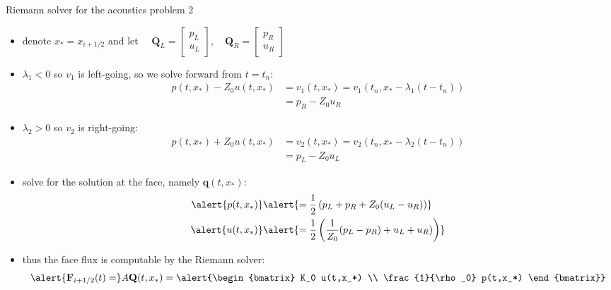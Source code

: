 \documentclass[10pt,dvipsnames,usepdftitle=false,
hyperref={pdftitle = {Finite volume methods},
    pdfauthor = {Ed Bueler}}]{beamer}
\newcommand{\bq}{\mathbf{q}}
\newcommand{\bF}{\mathbf{F}}
\newcommand{\bQ}{\mathbf{Q}}
\begin{document}
\begin{frame}{Riemann solver for the acoustics problem 2}

\begin{itemize}
\item denote $x_*=x_{i+1/2}$ and let $\quad \bQ_L = \begin{bmatrix} p_L \\ u_L \end{bmatrix}, \quad \bQ_R = \begin{bmatrix} p_R \\ u_R \end{bmatrix}$
\item $\lambda_1 < 0$ so $v_1$ is left-going, so we solve forward from $t=t_n$:
\begin{align*}
p(t,x_*) - Z_0 u(t,x_*) &= v_1(t,x_*) = v_1(t_n,x_*-\lambda_1 (t-t_n)) \\
   &= p_R - Z_0 u_R
\end{align*}
\item $\lambda_2 > 0$ so $v_2$ is right-going:
\begin{align*}
p(t,x_*) + Z_0 u(t,x_*) &= v_2(t,x_*) = v_2(t_n,x_*-\lambda_2 (t-t_n)) \\
   &= p_L - Z_0 u_L
\end{align*}
\item solve for the solution at the face, namely $\bq(t,x_*)$:
\begin{align*}
\alert{p(t,x_*)} &\alert{= \frac{1}{2} \left(p_L + p_R + Z_0 (u_L - u_R)\right)} \\
\alert{u(t,x_*)} &\alert{= \frac{1}{2} \left(\frac{1}{Z_0} (p_L - p_R) + u_L + u_R)\right)}
\end{align*}
\item thus the face flux is \alert{computable} by the Riemann solver:
    $$\alert{\bF_{i+1/2}(t) =} A \bQ(t,x_*) = \alert{\begin{bmatrix} K_0 u(t,x_*) \\ \frac{1}{\rho_0} p(t,x_*) \end{bmatrix}}$$
\end{itemize}
\end{frame}
\end{document}
